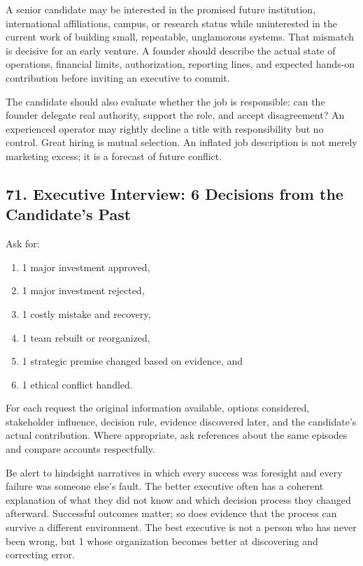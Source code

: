 A senior candidate may be interested in the promised future institution, international affiliations, campus, or research status while uninterested in the current work of building small, repeatable, unglamorous systems. That mismatch is decisive for an early venture. A founder should describe the actual state of operations, financial limits, authorization, reporting lines, and expected hands-on contribution before inviting an executive to commit.

The candidate should also evaluate whether the job is responsible: can the founder delegate real authority, support the role, and accept disagreement? An experienced operator may rightly decline a title with responsibility but no control. Great hiring is mutual selection. An inflated job description is not merely marketing excess; it is a forecast of future conflict.

\subsection*{71. Executive Interview: 6 Decisions from the Candidate's Past}

Ask for:
\begin{enumerate}[leftmargin=*]
\item 1 major investment approved,
\item 1 major investment rejected,
\item 1 costly mistake and recovery,
\item 1 team rebuilt or reorganized,
\item 1 strategic premise changed based on evidence, and
\item 1 ethical conflict handled.
\end{enumerate}
For each request the original information available, options considered, stakeholder influence, decision rule, evidence discovered later, and the candidate's actual contribution. Where appropriate, ask references about the same episodes and compare accounts respectfully.

Be alert to hindsight narratives in which every success was foresight and every failure was someone else's fault. The better executive often has a coherent explanation of what they did not know and which decision process they changed afterward. Successful outcomes matter; so does evidence that the process can survive a different environment. The best executive is not a person who has never been wrong, but 1 whose organization becomes better at discovering and correcting error.

